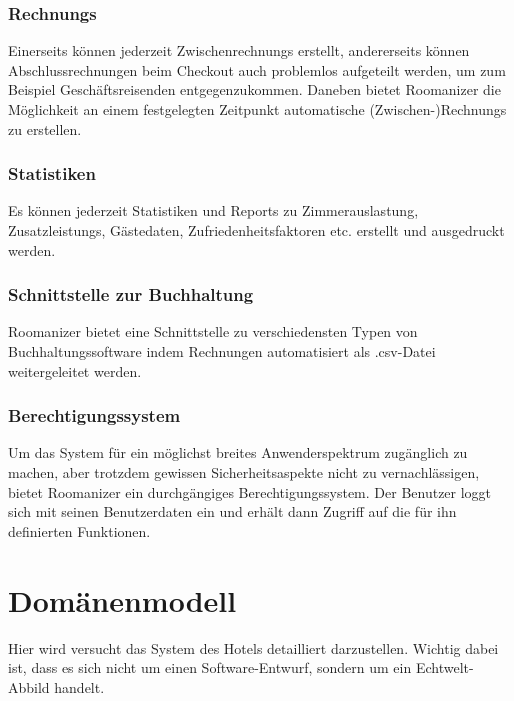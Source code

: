 \documentclass[10pt,a4paper,titlepage]{article}
\begin{document}
\subsubsection{\Glspl{Rechnung}}
Einerseits können jederzeit \Glspl{Zwischenrechnung} erstellt, andererseits können Abschlussrechnungen beim \Gls{Checkout} auch problemlos aufgeteilt werden, um zum Beispiel Geschäftsreisenden entgegenzukommen. Daneben bietet Roomanizer die Möglichkeit an einem festgelegten Zeitpunkt automatische (Zwischen-)\Glspl{Rechnung} zu erstellen. 

\subsubsection{Statistiken}
Es können jederzeit Statistiken und \Glspl{Report} zu Zimmerauslastung, \Glspl{Zusatzleistung}, Gästedaten, Zufriedenheitsfaktoren etc. erstellt und ausgedruckt werden.

\subsubsection{Schnittstelle zur Buchhaltung}
Roomanizer bietet eine Schnittstelle zu verschiedensten Typen von Buchhaltungssoftware indem Rechnungen automatisiert als .csv-Datei weitergeleitet werden.

\subsubsection{Berechtigungssystem}
Um das System für ein möglichst breites Anwenderspektrum zugänglich zu machen, aber trotzdem gewissen Sicherheitsaspekte nicht zu vernachlässigen, bietet Roomanizer ein durchgängiges Berechtigungssystem. Der Benutzer loggt sich mit seinen Benutzerdaten ein und erhält dann Zugriff auf die für ihn definierten Funktionen.

\newpage

\section{Domänenmodell}
Hier wird versucht das System des Hotels detailliert darzustellen. Wichtig dabei ist, dass es sich nicht um einen Software-Entwurf, sondern um ein Echtwelt-Abbild handelt.
\end{document}
